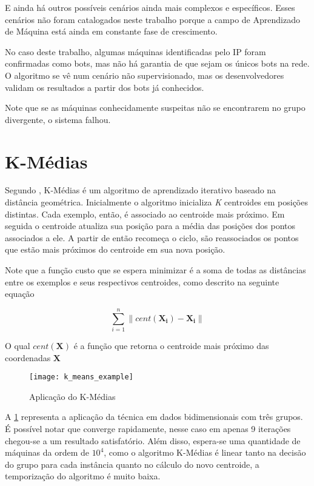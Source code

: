 E ainda há outros possíveis cenários ainda mais complexos e específicos. Esses cenários não foram catalogados neste trabalho porque a campo de Aprendizado de Máquina está ainda em constante fase de crescimento.

No caso deste trabalho, algumas máquinas identificadas pelo IP foram confirmadas como bots, mas não há garantia de que sejam os únicos bots na rede. O algoritmo se vê num cenário não supervisionado, mas os desenvolvedores validam os resultados a partir dos bots já conhecidos.

Note que se as máquinas conhecidamente suspeitas não se encontrarem no grupo divergente, o sistema falhou.

\section{K-Médias}

Segundo \citet{witten2011data}, K-Médias é um algoritmo de aprendizado iterativo baseado na distância geométrica. Inicialmente o algoritmo inicializa \textit{K} centroides em posições distintas. Cada exemplo, então, é associado ao centroide mais próximo. Em seguida o centroide atualiza sua posição para a média das posições dos pontos associados a ele. A partir de então recomeça o ciclo, são reassociados os pontos que estão mais próximos do centroide em sua nova posição.

Note que a função custo que se espera minimizar é a soma de todas as distâncias entre os exemplos e seus respectivos centroides, como descrito na seguinte equação

\[
\sum_{i=1}^{n} \lVert cent(\mathbf{X_{i}}) - \mathbf{X_{i}} \rVert
\]

O qual \(cent(\mathbf{X})\) é a função que retorna o centroide mais próximo das coordenadas \(\mathbf{X}\)

\begin{figure}
\texttt{[image: k\_means\_example]}
\caption[Aplicação do K-Médias]{Aplicação do K-Médias} \label{fig:k_means_example}
\end{figure}

A \ref{fig:k_means_example} representa a aplicação da técnica em dados bidimensionais com três grupos. É possível notar que converge rapidamente, nesse caso em apenas 9 iterações chegou-se a um resultado satisfatório. Além disso, espera-se uma quantidade de máquinas da ordem de \(10^4\), como o algoritmo K-Médias é linear tanto na decisão do grupo para cada instância quanto no cálculo do novo centroide, a temporização do algoritmo é muito baixa.

